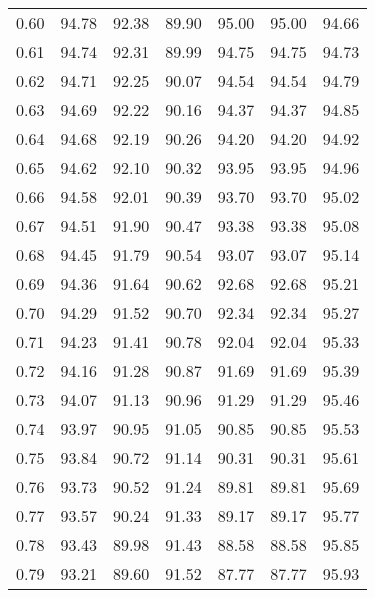 \begin{tabular}{|c|c|c|c|c|c|c|}
      0.60 &     94.78 &     92.38 &      89.90 &   95.00 &      95.00 &         94.66 \\
      0.61 &     94.74 &     92.31 &      89.99 &   94.75 &      94.75 &         94.73 \\
      0.62 &     94.71 &     92.25 &      90.07 &   94.54 &      94.54 &         94.79 \\
      0.63 &     94.69 &     92.22 &      90.16 &   94.37 &      94.37 &         94.85 \\
      0.64 &     94.68 &     92.19 &      90.26 &   94.20 &      94.20 &         94.92 \\
      0.65 &     94.62 &     92.10 &      90.32 &   93.95 &      93.95 &         94.96 \\
      0.66 &     94.58 &     92.01 &      90.39 &   93.70 &      93.70 &         95.02 \\
      0.67 &     94.51 &     91.90 &      90.47 &   93.38 &      93.38 &         95.08 \\
      0.68 &     94.45 &     91.79 &      90.54 &   93.07 &      93.07 &         95.14 \\
      0.69 &     94.36 &     91.64 &      90.62 &   92.68 &      92.68 &         95.21 \\
      0.70 &     94.29 &     91.52 &      90.70 &   92.34 &      92.34 &         95.27 \\
      0.71 &     94.23 &     91.41 &      90.78 &   92.04 &      92.04 &         95.33 \\
      0.72 &     94.16 &     91.28 &      90.87 &   91.69 &      91.69 &         95.39 \\
      0.73 &     94.07 &     91.13 &      90.96 &   91.29 &      91.29 &         95.46 \\
      0.74 &     93.97 &     90.95 &      91.05 &   90.85 &      90.85 &         95.53 \\
      0.75 &     93.84 &     90.72 &      91.14 &   90.31 &      90.31 &         95.61 \\
      0.76 &     93.73 &     90.52 &      91.24 &   89.81 &      89.81 &         95.69 \\
      0.77 &     93.57 &     90.24 &      91.33 &   89.17 &      89.17 &         95.77 \\
      0.78 &     93.43 &     89.98 &      91.43 &   88.58 &      88.58 &         95.85 \\
      0.79 &     93.21 &     89.60 &      91.52 &   87.77 &      87.77 &         95.93 \\

\end{tabular}
